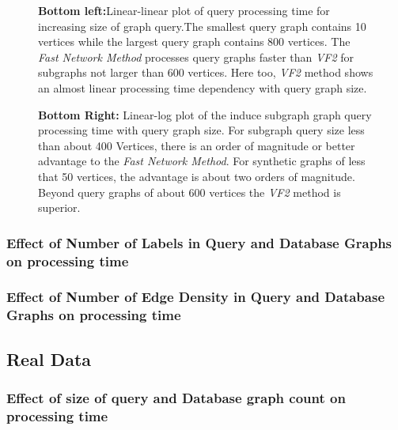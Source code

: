 \begin{figure}[H]
{\textbf{ Bottom left:}Linear-linear plot of  query processing time for increasing size of graph query.The smallest query graph contains 10 vertices while the largest query graph contains 800 vertices. The \textit{Fast Network Method} processes query graphs faster than \textit{VF2} for subgraphs not larger than 600 vertices. Here too, \textit{VF2} method shows an almost linear processing time  dependency with query graph size.  

\textbf{Bottom Right:} Linear-log plot of the induce subgraph graph query processing time with query graph size. For subgraph query size less than about 400 Vertices, there is an order of magnitude or better advantage to the \textit{Fast Network Method}. For synthetic graphs of less that 50 vertices, the advantage is about two orders of magnitude. Beyond query graphs of about 600 vertices the \textit{VF2} method is superior.
}
\label{fig:fig91}
\end{figure}


\subsubsection{Effect of Number of Labels in Query and Database Graphs on processing time}

\subsubsection{Effect of Number of Edge Density in Query and Database Graphs on processing time}

\subsection{Real Data}

\subsubsection{Effect of size of query and Database graph count on processing time}

